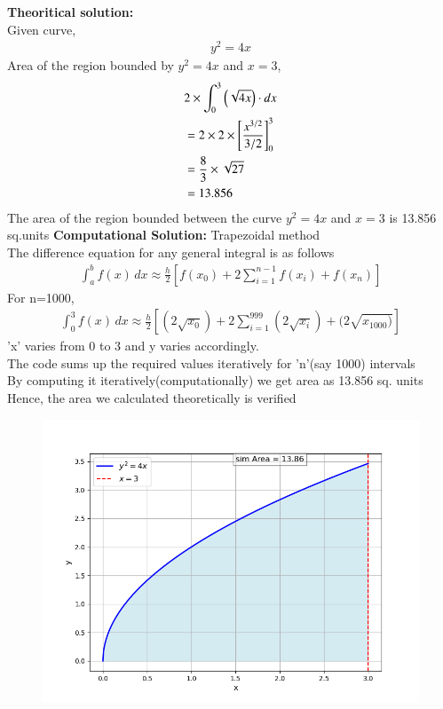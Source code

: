 \documentclass[journal]{IEEEtran}
\begin{document}
\textbf{Theoritical solution:}\\
Given curve,
\begin{align}
    y^2=4x
\end{align}
Area of the region bounded by $y^2=4x$ and $x=3$,
\begin{align}
   & 2 \times \int_0^3\left(\sqrt{4x}\right)\cdot dx\\
   &= 2 \times 2 \times\left[ \frac{x^{3/2}}{3/2} \right]_0^3 \\
    &= \frac{8}{3} \times \sqrt{27}\\
    &= 13.856
\end{align}
The area of the region bounded between the curve $y^2=4x$ and $x=3$ is 13.856 sq.units
\textbf{Computational Solution:} Trapezoidal method\\
The difference equation for any general integral is as follows
\begin{align}    
\int_a^b f(x) \, dx \approx \frac{h}{2} \left[ f(x_0) + 2 \sum_{i=1}^{n-1} f(x_i) + f(x_n) \right]   
\end{align}
For n=1000,
\begin{align}    
\int_0^3 f(x) \, dx \approx \frac{h}{2} \left[ (2\sqrt{x_0}) + 2 \sum_{i=1}^{999} (2\sqrt{x_i}) + (2\sqrt{x_{1000})} \right]   
\end{align}
'x' varies from 0 to 3 and y varies accordingly.\\
The code sums up the required values iteratively for 'n'(say 1000) intervals\\
By computing it iteratively(computationally) we get area as 13.856 sq. units \\
Hence, the area we calculated theoretically is verified
\begin{figure}[ht!]
   \centering
   \includegraphics[width=\columnwidth]{figs/Figure_1.png}
\end{figure}
\end{document}
